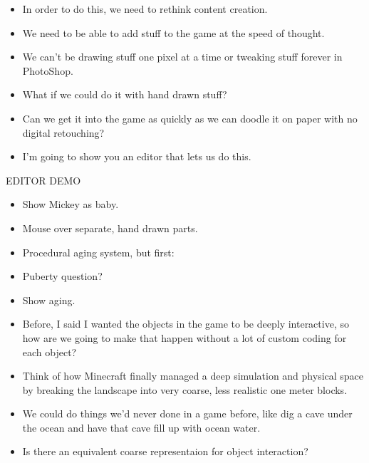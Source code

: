 \documentclass[12pt]{article}
\begin{document}
{\begin{itemize}
\item In order to do this, we need to rethink content creation.

\item We need to be able to add stuff to the game at the speed of thought.

\item We can't be drawing stuff one pixel at a time or tweaking stuff forever in PhotoShop.

\item What if we could do it with hand drawn stuff?

\item Can we get it into the game as quickly as we can doodle it on paper with no digital retouching?

\item I'm going to show you an editor that lets us do this.

\end{itemize}

\newpage 

EDITOR DEMO

\begin{itemize}

\item Show Mickey as baby.

\item Mouse over separate, hand drawn parts.

\item Procedural aging system, but first:

\item Puberty question?

\item Show aging.

\item Before, I said I wanted the objects in the game to be deeply interactive, so how are we going to make that happen without a lot of custom coding for each object?

\item Think of how Minecraft finally managed a deep simulation and physical space by breaking the landscape into very coarse, less realistic one meter blocks.

\item We could do things we'd never done in a game before, like dig a cave under the ocean and have that cave fill up with ocean water.

\item Is there an equivalent coarse representaion for object interaction?


\end{itemize}}
\end{document}
